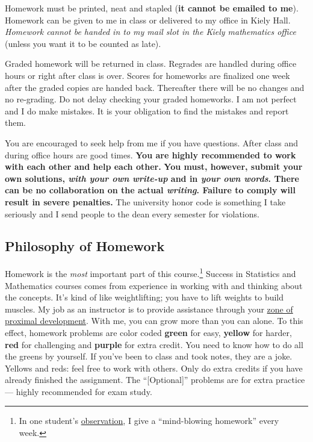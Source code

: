 \documentclass[12pt]{article}
\newcommand{\ingreen}[1]{\color{green}\textbf{#1} \color{black}}
\newcommand{\inyellow}[1]{\color{yellow}\textbf{#1} \color{black}}
\newcommand{\inred}[1]{\color{red}\textbf{#1} \color{black}}
\newcommand{\inpurple}[1]{\color{purple}\textbf{#1} \color{black}}
\newcommand{\qu}[1]{``#1''}
\begin{document}
Homework must be printed, neat and stapled (\textbf{it cannot be emailed to me}). Homework can be given to me in class or delivered to my office in Kiely Hall. \textit{Homework cannot be handed in to my mail slot in the Kiely mathematics office} (unless you want it to be counted as late).

Graded homework will be returned in class. Regrades are handled during office hours or right after class is over. Scores for homeworks are finalized one week after the graded copies are handed back. Thereafter there will be no changes and no re-grading. Do not delay checking your graded homeworks. I am not perfect and I do make mistakes. It is your obligation to find the mistakes and report them.

You are encouraged to seek help from me if you have questions. After class and during office hours are good times. \ingreen{You are highly recommended to work with each other and help each other.} \inred{You must, however, submit your own solutions, \textit{with your own write-up} and in \textit{your own words}. There can be no collaboration on the actual \textit{writing}. Failure to comply will result in severe penalties.} The university honor code is something I take seriously and I send people to the dean every semester for violations.


\subsection*{Philosophy of Homework}


Homework is the \textit{most} important part of this course.\footnote{In one student's \href{http://www.ratemyprofessors.com/ShowRatings.jsp?tid=1951051}{observation}, I give a \qu{mind-blowing homework} every week.} Success in Statistics and Mathematics courses comes from experience in working with and thinking about the concepts. It's kind of like weightlifting; you have to lift weights to build muscles. My job as an instructor is to provide assistance through your \href{http://en.wikipedia.org/wiki/Zone_of_proximal_development}{zone of proximal development}. With me, you can grow more than you can alone. To this effect, homework problems are color coded \ingreen{green} for easy, \inyellow{yellow} for harder, \inred{red} for challenging and \inpurple{purple} for extra credit. You need to know how to do all the greens by yourself. If you've been to class and took notes, they are a joke. Yellows and reds: feel free to work with others. Only do extra credits if you have already finished the assignment. The \qu{[Optional]} problems are for extra practice --- highly recommended for exam study.
\end{document}
